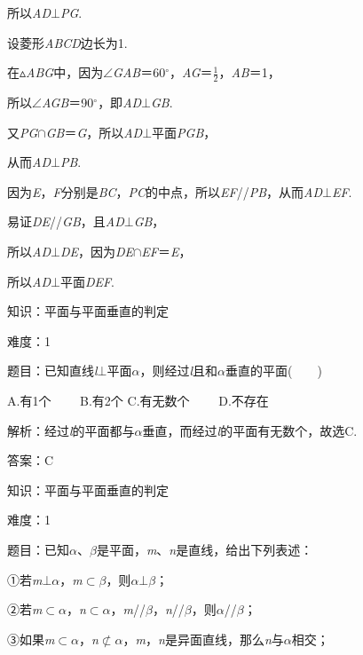 \documentclass{article} %
\begin{document}
所以\textit{AD}$\mathrm{\bot}$\textit{PG}.

设菱形\textit{ABCD}边长为1.

在$\mathrm{\vartriangle}$\textit{ABG}中，因为$\mathrm{\angle}$\textit{GAB}＝60$\mathrm{{}^\circ}$，\textit{AG}＝$\frac{1}{2}$，\textit{AB}＝1，

所以$\mathrm{\angle}$\textit{AGB}＝90$\mathrm{{}^\circ}$，即\textit{AD}$\mathrm{\bot}$\textit{GB}.

又\textit{PG}$\mathrm{\cap}$\textit{GB}＝\textit{G}，所以\textit{AD}$\mathrm{\bot}$平面\textit{PGB}，

从而\textit{AD}$\mathrm{\bot}$\textit{PB}.

因为\textit{E}，\textit{F}分别是\textit{BC}，\textit{PC}的中点，所以\textit{EF}//\textit{PB}，从而\textit{AD}$\mathrm{\bot}$\textit{EF}.

易证\textit{DE}//\textit{GB}，且\textit{AD}$\mathrm{\bot}$\textit{GB}，

所以\textit{AD}$\mathrm{\bot}$\textit{DE}，因为\textit{DE}$\mathrm{\cap}$\textit{EF}＝\textit{E}，

所以\textit{AD}$\mathrm{\bot}$平面\textit{DEF}.

知识：平面与平面垂直的判定

难度：1

题目：已知直线\textit{l}$\mathrm{\bot}$平面\textit{$\alpha$}，则经过\textit{l}且和\textit{$\alpha$}垂直的平面(　　)

A.有1个　　 B.有2个 C.有无数个　　 D.不存在

解析：经过\textit{l}的平面都与\textit{$\alpha$}垂直，而经过\textit{l}的平面有无数个，故选C.

答案：C

知识：平面与平面垂直的判定

难度：1

题目：已知\textit{$\alpha$}、\textit{$\beta$}是平面，\textit{m}、\textit{n}是直线，给出下列表述：

①若\textit{m}$\mathrm{\bot}$\textit{$\alpha$}，\textit{m}$\mathrm{\subset }$\textit{$\beta$}，则\textit{$\alpha$}$\mathrm{\bot}$\textit{$\beta$}；

②若\textit{m}$\mathrm{\subset }$\textit{$\alpha$}，\textit{n}$\mathrm{\subset }$\textit{$\alpha$}，\textit{m}//\textit{$\beta$}，\textit{n}//\textit{$\beta$}，则\textit{$\alpha$}//\textit{$\beta$}；

③如果\textit{m}$\mathrm{\subset }$\textit{$\alpha$}，\textit{n}$\mathrm{\nsubset}$\textit{$\alpha$}，\textit{m}，\textit{n}是异面直线，那么\textit{n}与\textit{$\alpha$}相交；
\end{document}
